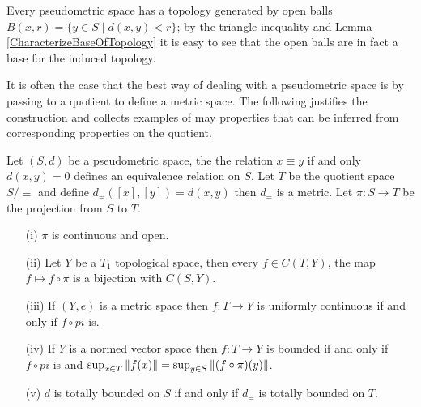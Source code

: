 Every pseudometric space has a topology generated
by open balls $B(x,r) = \lbrace y \in S \mid d(x,y) < r \rbrace$; by the triangle inequality
and Lemma \ref{CharacterizeBaseOfTopology} it is easy to see that the open balls are in fact
a base for the induced topology.

It is often the case that the best way of dealing with a pseudometric space is by passing to a quotient to define a metric space.  The following justifies the construction and collects examples of may properties that can be inferred from corresponding properties on the quotient.
\begin{prop}\label{QuotientOfPseudometricSpace}Let $(S,d)$ be a pseudometric space, the the relation $x \equiv y$ if and only $d(x,y) = 0$ defines an equivalence
relation on $S$.  Let $T$ be the quotient space $S/\equiv$ and define $d_{\equiv}([x], [y]) = d(x,y)$ then $d_\equiv$ is a metric.  Let $\pi : S \to T$ be the projection from $S$ to $T$.  
\begin{itemize}
\item[(i)] $\pi$ is continuous and open.  
\item[(ii)] Let $Y$ be a $T_1$ topological space, then every $f \in C(T,Y)$, the map $f \mapsto f \circ \pi$ is a bijection with $C(S,Y)$.  
\item[(iii)] If $(Y,e)$ is a metric space then $f : T \to Y$ is uniformly continuous if and only if $f \circ pi$ is.  
\item[(iv)]  If $Y$ is a normed vector space then $f : T \to Y$ is bounded if and only if $f \circ pi$ is and $\sup_{x \in T} \left \lVert f(x) \right \rVert = \sup_{y \in S} \left \lVert (f \circ \pi)(y) \right \rVert$.
\item[(v)] $d$ is totally bounded on $S$ if and only if $d_{\equiv}$ is totally bounded on $T$.
\end{itemize}
\end{prop}
